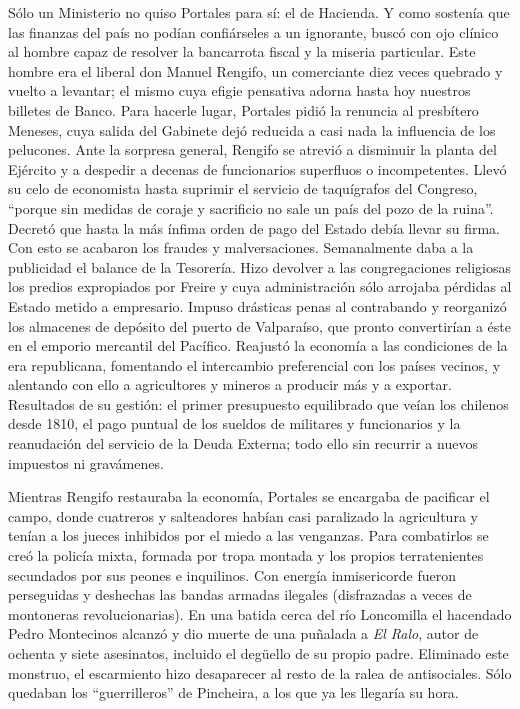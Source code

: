 \documentclass[10pt,twoside,openright]{memoir}
\begin{document}
Sólo un Ministerio no quiso Portales
para sí: el de Hacienda. Y como sostenía que las finanzas del país no
podían confiárseles a un ignorante, buscó con ojo clínico al hombre
capaz de resolver la bancarrota fiscal y la miseria particular. Este
hombre era el liberal don Manuel Rengifo, un comerciante diez veces
quebrado y vuelto a levantar; el mismo cuya efigie pensativa adorna
hasta hoy nuestros billetes de Banco.
Para hacerle lugar, Portales pidió la renuncia al presbítero Meneses, cuya
salida del Gabinete dejó reducida a
casi nada la influencia de los pelucones. Ante la sorpresa general,
Rengifo se atrevió a disminuir la planta del Ejército y a despedir a
decenas de funcionarios superfluos o incompetentes. Llevó su celo de
economista hasta suprimir el servicio de taquígrafos del Congreso,
``porque sin medidas de coraje y sacrificio no sale un país del pozo de
la ruina''. Decretó que hasta la más ínfima orden de pago del Estado
debía llevar su firma. Con esto se acabaron los fraudes y
malversaciones. Semanalmente daba a la publicidad el balance de la
Tesorería. Hizo devolver a las congregaciones religiosas los predios
expropiados por Freire y cuya administración sólo arrojaba pérdidas al
Estado metido a empresario. Impuso drásticas penas al contrabando y
reorganizó los almacenes de depósito del puerto de Valparaíso, que
pronto convertirían a éste en el emporio mercantil del Pacífico.
Reajustó la economía a las condiciones de la era republicana, fomentando
el intercambio preferencial con los países vecinos, y alentando con ello
a agricultores y mineros a producir más y a exportar. Resultados de su
gestión: el primer presupuesto equilibrado que veían los chilenos desde
1810, el pago puntual de los sueldos de militares y funcionarios y la
reanudación del servicio de la Deuda Externa; todo ello sin recurrir a
nuevos impuestos ni gravámenes.

Mientras Rengifo restauraba la economía, Portales se encargaba de pacificar el campo,
donde cuatreros y salteadores habían casi paralizado la agricultura y
tenían a los jueces inhibidos por el miedo a las venganzas. Para
combatirlos se creó la policía mixta, formada por tropa montada y los
propios terratenientes secundados por sus peones e inquilinos. Con
energía inmisericorde fueron perseguidas y deshechas las bandas armadas
ilegales (disfrazadas a veces de montoneras revolucionarias). En una
batida cerca del río Loncomilla el hacendado Pedro Montecinos alcanzó y
dio muerte de una puñalada a \emph{El Ralo}, autor de ochenta y siete
asesinatos, incluido el degüello de su propio padre. Eliminado este
monstruo, el escarmiento hizo desaparecer al resto de la ralea de
antisociales. Sólo quedaban los ``guerrilleros'' de Pincheira, a los que
ya les llegaría su hora. 
\end{document}
